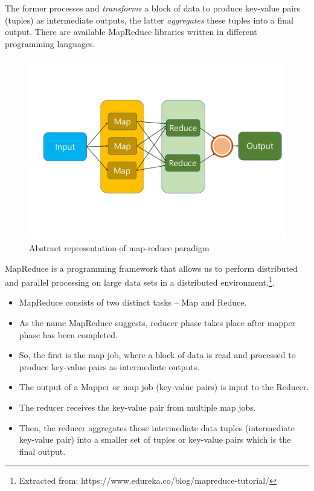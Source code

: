 The former processes and \textit{transforms} a block of data to produce key-value pairs (tuples) as intermediate outputs, the latter \textit{aggregates} these tuples into a final output.
There are available MapReduce libraries written in different programming languages. 
\begin{figure}
	\centering
	\includegraphics[width=\columnwidth]{Images/map_reduce_1.pdf}  
	\caption[map-reduce model]{Abstract representation of map-reduce paradigm}
	\label{fig:mapReduce}
\end{figure}

MapReduce is a programming framework that allows us to perform distributed and parallel processing on large data sets in a distributed environment.\footnote{Extracted from: https://www.edureka.co/blog/mapreduce-tutorial/}.
\begin{itemize}
	\item MapReduce consists of two distinct tasks – Map and Reduce.
	\item As the name MapReduce suggests, reducer phase takes place after mapper phase has been completed.
	\item So, the first is the map job, where a block of data is read and processed to produce key-value pairs as intermediate outputs.
	\item The output of a Mapper or map job (key-value pairs) is input to the Reducer.
	\item The reducer receives the key-value pair from multiple map jobs.
	\item Then, the reducer aggregates those intermediate data tuples (intermediate key-value pair) into a smaller set of tuples or key-value pairs which is the final output.
\end{itemize}

